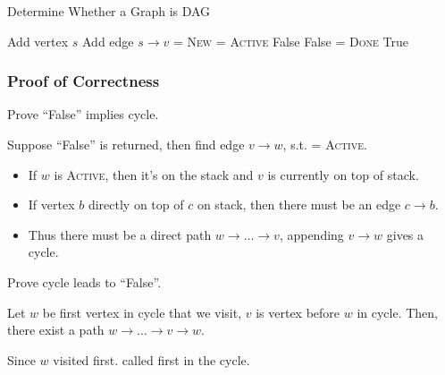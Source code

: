 \begin{algorithm}[H]
    \caption{Determine Whether a Graph is DAG}\label{algo:acyclicDFS}
    \begin{algorithmic}[1]
            \State Add vertex $s$
                \State Add edge $s \rightarrow v$
                \State {} = \textsc{New}
            \EndFor
            \Return {}
        \EndProcedure
            \State {} = \textsc{Active}
                    \Return False
                        \Return False
                    \EndIf
                \EndIf
            \EndFor
            \State {} = \textsc{Done}
            \Return True
        \EndProcedure
    \end{algorithmic}
\end{algorithm}

\subsubsection{Proof of Correctness}

Prove ``False'' implies cycle.

Suppose ``False'' is returned, then find edge $v \rightarrow w$,
s.t.  = \textsc{Active}.
\begin{itemize}
    \item If $w$ is \textsc{Active}, then it's on the stack and
        $v$ is currently on top of stack.
    \item If vertex $b$ directly on top of $c$ on stack,
        then there must be an edge $c \rightarrow b$.
    \item Thus there must be a direct path $w \rightarrow \ldots \rightarrow v$,
        appending $v \rightarrow w$ gives a cycle.
\end{itemize}

\noindent Prove cycle leads to ``False''.

Let $w$ be first vertex in cycle that we visit,
$v$ is vertex before $w$ in cycle. Then, there exist a path
$w \rightarrow \ldots \rightarrow v \rightarrow w$.

Since $w$ visited first. 
called first in the cycle.

